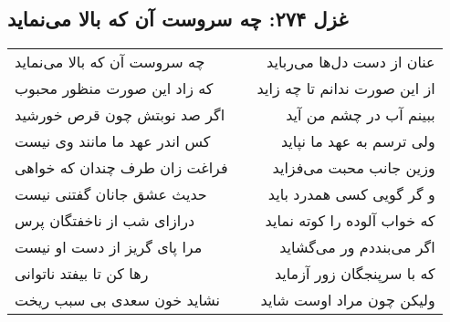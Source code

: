 \begin{center}
\section*{غزل ۲۷۴: چه سروست آن که بالا می‌نماید}
\label{sec:274}
\begin{longtable}{l p{0.5cm} r}
چه سروست آن که بالا می‌نماید
&&
عنان از دست دل‌ها می‌رباید
\\
که زاد این صورت منظور محبوب
&&
از این صورت ندانم تا چه زاید
\\
اگر صد نوبتش چون قرص خورشید
&&
ببینم آب در چشم من آید
\\
کس اندر عهد ما مانند وی نیست
&&
ولی ترسم به عهد ما نپاید
\\
فراغت زان طرف چندان که خواهی
&&
وزین جانب محبت می‌فزاید
\\
حدیث عشق جانان گفتنی نیست
&&
و گر گویی کسی همدرد باید
\\
درازای شب از ناخفتگان پرس
&&
که خواب آلوده را کوته نماید
\\
مرا پای گریز از دست او نیست
&&
اگر می‌بنددم ور می‌گشاید
\\
رها کن تا بیفتد ناتوانی
&&
که با سرپنجگان زور آزماید
\\
نشاید خون سعدی بی سبب ریخت
&&
ولیکن چون مراد اوست شاید
\\
\end{longtable}
\end{center}
